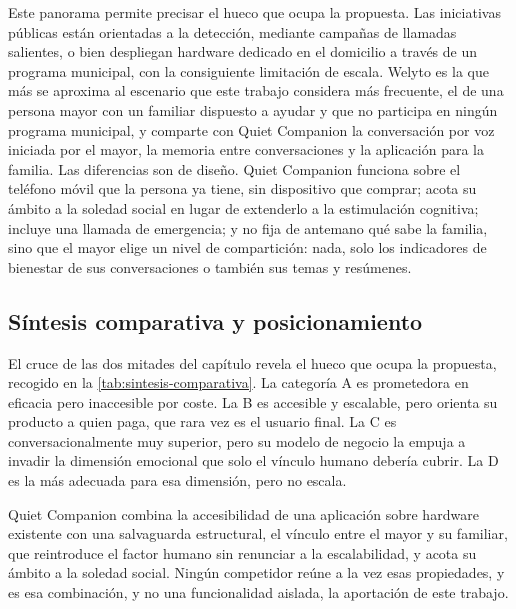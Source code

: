 Este panorama permite precisar el hueco que ocupa la propuesta. Las iniciativas públicas están orientadas a la detección, mediante campañas de llamadas salientes, o bien despliegan hardware dedicado en el domicilio a través de un programa municipal, con la consiguiente limitación de escala. Welyto es la que más se aproxima al escenario que este trabajo considera más frecuente, el de una persona mayor con un familiar dispuesto a ayudar y que no participa en ningún programa municipal, y comparte con Quiet Companion la conversación por voz iniciada por el mayor, la memoria entre conversaciones y la aplicación para la familia. Las diferencias son de diseño. Quiet Companion funciona sobre el teléfono móvil que la persona ya tiene, sin dispositivo que comprar; acota su ámbito a la soledad social en lugar de extenderlo a la estimulación cognitiva; incluye una llamada de emergencia; y no fija de antemano qué sabe la familia, sino que el mayor elige un nivel de compartición: nada, solo los indicadores de bienestar de sus conversaciones o también sus temas y resúmenes.

\subsection{Síntesis comparativa y posicionamiento}

El cruce de las dos mitades del capítulo revela el hueco que ocupa la propuesta, recogido en la \autoref{tab:sintesis-comparativa}. La categoría A es prometedora en eficacia pero inaccesible por coste. La B es accesible y escalable, pero orienta su producto a quien paga, que rara vez es el usuario final. La C es conversacionalmente muy superior, pero su modelo de negocio la empuja a invadir la dimensión emocional que solo el vínculo humano debería cubrir. La D es la más adecuada para esa dimensión, pero no escala.

Quiet Companion combina la accesibilidad de una aplicación sobre hardware existente con una salvaguarda estructural, el vínculo entre el mayor y su familiar, que reintroduce el factor humano sin renunciar a la escalabilidad, y acota su ámbito a la soledad social. Ningún competidor reúne a la vez esas propiedades, y es esa combinación, y no una funcionalidad aislada, la aportación de este trabajo.

